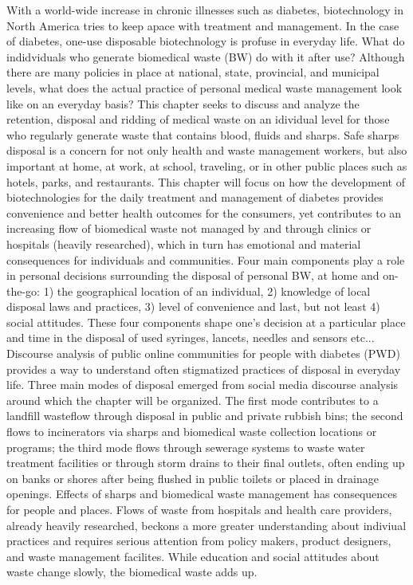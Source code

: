 \documentclass[12pt]{article}
\begin{document}
With a world-wide increase in chronic illnesses such as diabetes, biotechnology in North America tries to keep apace with treatment and management. In the case of diabetes, one-use disposable biotechnology is profuse in everyday life. What do indidviduals who generate biomedical waste (BW) do with it after use? Although there are many policies in place at national, state, provincial, and municipal levels, what does the actual practice of personal medical waste management look like on an everyday basis? This chapter seeks to discuss and analyze the retention, disposal and ridding of medical waste on an idividual level for those who regularly generate waste that contains blood, fluids and sharps.
Safe sharps disposal is a concern for not only health and waste management workers, but also important at home, at work, at school, traveling, or in other public places such as hotels, parks, and restaurants.  This chapter will focus on how the development of biotechnologies for the daily treatment and management of diabetes provides convenience and better health outcomes for the consumers, yet contributes to an increasing flow of biomedical waste not managed by and through clinics or hospitals (heavily researched), which in turn has emotional and material consequences for individuals and communities. Four main components play a role in personal decisions surrounding the disposal of personal BW, at home and on-the-go: 1) the geographical location of an individual, 2) knowledge of local disposal laws and practices, 3) level of convenience and last, but not least 4) social attitudes. These four components shape one's decision at a particular place and time in the disposal of used syringes, lancets, needles and sensors etc... Discourse analysis of public online communities for people with diabetes (PWD) provides a way to understand often stigmatized practices of disposal in everyday life. Three main modes of disposal emerged from social media discourse analysis around which the chapter will be organized. The first mode contributes to a landfill wasteflow through disposal in public and private rubbish bins; the second flows to incinerators via sharps and biomedical waste collection locations or programs; the third mode flows through sewerage systems to waste water treatment facilities or through storm drains to their final outlets, often ending up on banks or shores after being flushed in public toilets or placed in drainage openings. Effects of sharps and biomedical waste management has consequences for people and places. Flows of waste from hospitals and health care providers, already heavily researched, beckons a more greater understanding about indiviual practices and requires serious attention from policy makers, product designers, and waste management facilites. While education and social attitudes about waste change slowly, the biomedical waste adds up.
\newpage
\end{document}
